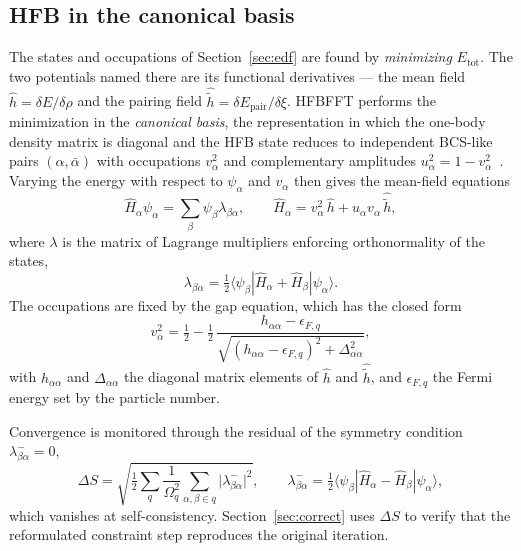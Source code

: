 \documentclass[preprint,12pt]{elsarticle}
\numberwithin{equation}{section}
\begin{document}
\subsection{HFB in the canonical basis}\label{sec:canon}
The states and occupations of Section~\ref{sec:edf} are found by \emph{minimizing} $E_{\mathrm{tot}}$. The two potentials named there are its functional derivatives --- the mean field $\hat h=\delta E/\delta\rho$ and the pairing field $\hat{\tilde h}=\delta E_{\mathrm{pair}}/\delta\xi$. HFBFFT performs the minimization in the \emph{canonical basis}, the representation in which the one-body density matrix is diagonal and the HFB state reduces to independent BCS-like pairs $(\alpha,\bar\alpha)$ with occupations $v_\alpha^2$ and complementary amplitudes $u_\alpha^2=1-v_\alpha^2$~\cite{ringschuck}. Varying the energy with respect to $\psi_\alpha$ and $v_\alpha$ then gives the mean-field equations
\begin{equation}\label{eq:mf}
\hat H_\alpha\psi_\alpha=\sum_\beta\psi_\beta\lambda_{\beta\alpha},\qquad
\hat H_\alpha = v_\alpha^2\,\hat h + u_\alpha v_\alpha\,\hat{\tilde h},
\end{equation}
where $\lambda$ is the matrix of Lagrange multipliers enforcing orthonormality of the states,
\begin{equation}\label{eq:lambda}
\lambda_{\beta\alpha}=\tfrac12\langle\psi_\beta|\hat H_\alpha+\hat H_\beta|\psi_\alpha\rangle.
\end{equation}
The occupations are fixed by the gap equation, which has the closed form
\begin{equation}\label{eq:gap}
v_\alpha^2=\tfrac12-\tfrac12\,\frac{h_{\alpha\alpha}-\epsilon_{F,q}}{\sqrt{(h_{\alpha\alpha}-\epsilon_{F,q})^2+\Delta_{\alpha\alpha}^2}},
\end{equation}
with $h_{\alpha\alpha}$ and $\Delta_{\alpha\alpha}$ the diagonal matrix elements of $\hat h$ and $\hat{\tilde h}$, and $\epsilon_{F,q}$ the Fermi energy set by the particle number.

Convergence is monitored through the residual of the symmetry condition $\lambda^-_{\beta\alpha}=0$,
\begin{equation}\label{eq:ds}
\Delta S=\sqrt{\tfrac12\sum_q\frac1{\Omega_q^2}\sum_{\alpha,\beta\in q}\bigl|\lambda^-_{\beta\alpha}\bigr|^2},\qquad
\lambda^-_{\beta\alpha}=\tfrac12\langle\psi_\beta|\hat H_\alpha-\hat H_\beta|\psi_\alpha\rangle,
\end{equation}
which vanishes at self-consistency. Section~\ref{sec:correct} uses $\Delta S$ to verify that the reformulated constraint step reproduces the original iteration.
\end{document}

